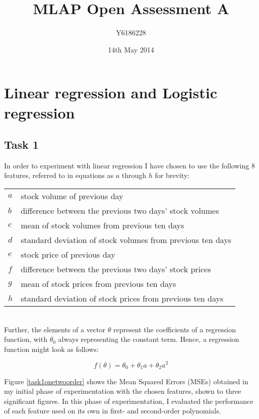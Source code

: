 \documentclass[a4paper,11pt]{article}
\title{MLAP Open Assessment A}
\author{Y6186228}
\date{14th May 2014}
\newcommand*{\fob}[2]{f(\theta) = \theta_0 + \theta_1 {#1} + \theta_2 {#2}}
\begin{document}
\maketitle

\section{Linear regression and Logistic regression}
\subsection{Task 1}
In order to experiment with linear regression I have chosen to use the following 8 features, referred to in equations as $a$ through $h$ for brevity:\\

\begin{tabular}{l l}
	$a$	& stock volume of previous day \\
	$b$	& difference between the previous two days' stock volumes \\
	$c$	& mean of stock volumes from previous ten days \\
	$d$	& standard deviation of stock volumes from previous ten days \\
	$e$	& stock price of previous day \\
	$f$	& difference between the previous two days' stock prices \\
	$g$	& mean of stock prices from previous ten days \\
	$h$	& standard deviation of stock prices from previous ten days
\end{tabular}\\

Further, the elements of a vector $\theta$ represent the coefficients of a regression function, with $\theta_0$ always representing the constant term.  Hence, a regression function might look as follows:

\[ \fob{a}{a^2} \]

Figure \ref{task1onetwoorder} shows the Mean Squared Errors (MSEs) obtained in my initial phase of experimentation with the chosen features, shown to three significant figures.  In this phase of experimentation, I evaluated the performance of each feature used on its own in first- and second-order polynomials.
\end{document}
